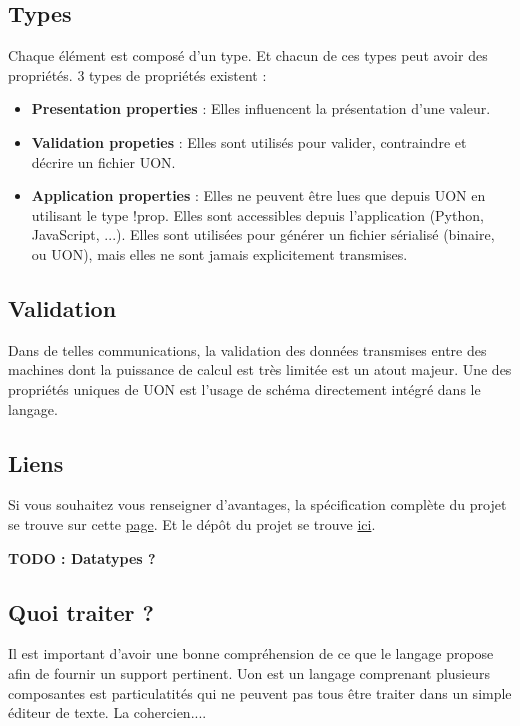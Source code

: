 \documentclass[
    iict, %
    il, %
]{heig-tb}
\begin{document}
\subsection{Types}
Chaque élément est composé d'un type. Et chacun de ces types peut avoir des propriétés.
3 types de propriétés existent :
\begin{itemize}
    \item \textbf{Presentation properties} : Elles influencent la présentation d'une valeur.
    \item \textbf{Validation propeties} : Elles sont utilisés pour valider, contraindre et décrire un fichier UON.
    \item \textbf{Application properties} : Elles ne peuvent être lues que depuis UON en utilisant le type !prop. Elles sont accessibles depuis l'application (Python, JavaScript, ...). Elles sont utilisées pour générer un fichier sérialisé (binaire, ou UON), mais elles ne sont jamais explicitement transmises.
\end{itemize}

\subsection{Validation}
Dans de telles communications, la validation des données transmises entre des machines dont la puissance de calcul est très limitée est un atout majeur.
Une des propriétés uniques de UON est l'usage de schéma directement intégré dans le langage.

\subsection{Liens}
Si vous souhaitez vous renseigner d'avantages, la spécification complète du projet se trouve sur cette \href{https://github.com/uon-language/specification/}{page}.
Et le dépôt du projet se trouve \href{https://github.com/uon-language/specification}{ici}.

\textbf{TODO : Datatypes ?}

\subsection{Quoi traiter ?}
Il est important d'avoir une bonne compréhension de ce que le langage propose afin de fournir un support pertinent.
Uon est un langage comprenant plusieurs composantes est particulatités qui ne peuvent pas tous être traiter dans un simple éditeur de texte.
La cohercien....
\end{document}
